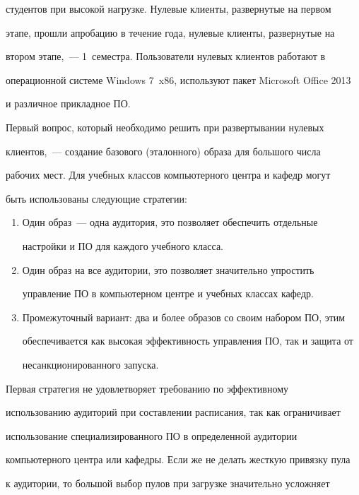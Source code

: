 студентов при высокой нагрузке. Нулевые клиенты, развернутые на первом 

этапе, прошли апробацию в течение года, нулевые клиенты, развернутые на 

втором этапе,~--- 1~семестра. Пользователи нулевых клиентов работают в 

операционной системе Windows 7~x86, используют пакет Microsoft Office 2013 

и различное прикладное ПО. 

  

  Первый вопрос, который необходимо решить при развертывании нулевых 

клиентов,~--- создание базового (эталонного) образа для большого числа 

рабочих мест. Для учебных классов компьютерного центра и кафедр могут 

быть использованы следующие стратегии:

  \begin{enumerate}[1.]

\item Один образ~--- одна аудитория, это позволяет обеспечить отдельные 

настройки и ПО для каждого учебного класса.

\item Один образ на все аудитории, это позволяет значительно упростить 

управ\-ле\-ние ПО в компьютерном центре и учебных классах кафедр.

\item Промежуточный вариант: два и более образов со своим набором ПО, этим 

обеспечивается как высокая эффективность управления ПО, так и защита от 

несанкционированного запуска. 

\end{enumerate}

  

  Первая стратегия не удовлетворяет требованию по эффективному 

использованию аудиторий при составлении расписания, так как ограничивает 

использование специализированного ПО в определенной аудитории 

компьютерного центра или кафедры. Если же не делать жесткую привязку пула 

к аудитории, то большой выбор пулов при загрузке значительно усложняет 

